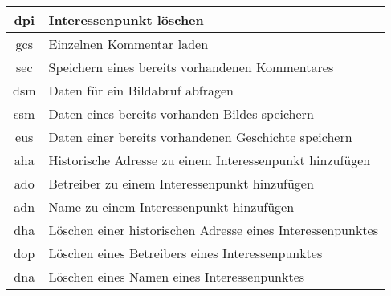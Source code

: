 \begin{longtable}[H]{|c|p{12cm}|}
		dpi                 & Interessenpunkt löschen                                                                                                                            \\ \hline
		gcs                 & Einzelnen Kommentar laden                                                                                                                          \\ \hline
		sec                 & Speichern eines bereits vorhandenen Kommentares                                                                                                    \\ \hline
		dsm                 & Daten für ein Bildabruf abfragen                                                                                                                   \\ \hline
		ssm                 & Daten eines bereits vorhanden Bildes speichern                                                                                                     \\ \hline
		eus                 & Daten einer bereits vorhandenen Geschichte speichern                                                                                               \\ \hline
		aha                 & Historische Adresse zu einem Interessenpunkt hinzufügen                                                                                            \\ \hline
		ado                 & Betreiber zu einem Interessenpunkt hinzufügen                                                                                                      \\ \hline
		adn                 & Name zu einem Interessenpunkt hinzufügen                                                                                                           \\ \hline
		dha                 & Löschen einer historischen Adresse eines Interessenpunktes                                                                                         \\ \hline
		dop                 & Löschen eines Betreibers eines Interessenpunktes                                                                                                   \\ \hline
		dna                 & Löschen eines Namen eines Interessenpunktes                                                                                                        \\ \hline

\end{longtable}
